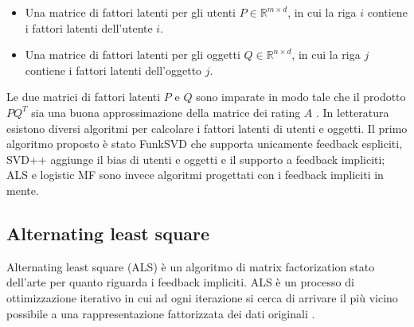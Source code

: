 \begin{itemize}
	\item Una matrice di fattori latenti per gli utenti $P \in \mathbb{R}^{m \times d}$, in cui la riga $i$ contiene i fattori latenti dell'utente $i$.
	\item Una matrice di fattori latenti per gli oggetti $Q \in \mathbb{R}^{n \times d}$, in cui la riga $j$ contiene i fattori latenti dell'oggetto $j$.
\end{itemize}
Le due matrici di fattori latenti $P$ e $Q$ sono imparate in modo tale che il prodotto $PQ^T$ sia una buona approssimazione della matrice dei rating $A$ \cite{mf-google}. In letteratura esistono diversi algoritmi per calcolare i fattori latenti di utenti e oggetti. Il primo algoritmo proposto è stato FunkSVD \cite{funk-mf} che supporta unicamente feedback espliciti, SVD++ \cite{svd++} aggiunge il bias di utenti e oggetti e il supporto a feedback impliciti; ALS \cite{als} e logistic MF \cite{logistic-mf} sono invece algoritmi progettati con i feedback impliciti in mente.


\subsection{Alternating least square}
Alternating least square (ALS) \cite{als} è un algoritmo di matrix factorization stato dell'arte per quanto riguarda i feedback impliciti. ALS è un processo di ottimizzazione iterativo in cui ad ogni iterazione si cerca di arrivare il più vicino possibile a una rappresentazione fattorizzata dei dati originali \cite{als-medium}. 

